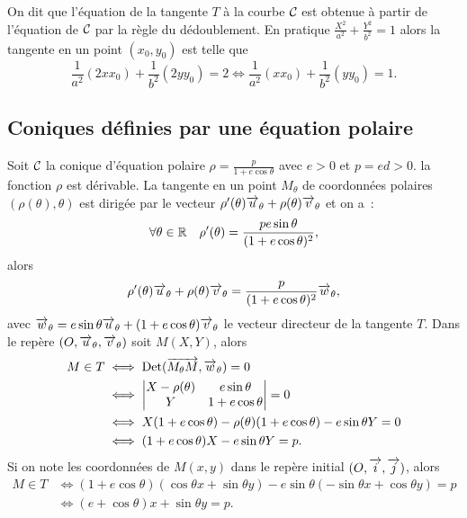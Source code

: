 On dit que l'équation de la tangente \(T\) à la courbe \(\mathcal{C}_{{}}\) est 
obtenue à partir de l'équation de \(\mathcal{C}_{{}}\) par la règle du 
dédoublement. En pratique \(\frac{X^2}{a^2} + \frac{Y^2}{b^2} = 1\) alors 
la tangente en un point \((x_0, y_0)\) est telle que
\begin{equation}
  \frac{1}{a^2}(2xx_0) + \frac{1}{b^2}(2yy_0) = 2 \iff \frac{1}{a^2}(xx_0) 
  + \frac{1}{b^2}(yy_0) = 1.
\end{equation}

\subsection{Coniques définies par une équation polaire}

Soit \(\mathcal{C}_{{}}\) la conique d'équation polaire \(\rho = \frac{p}{1 + e\cos 
\theta}\) avec \(e>0\) et \(p = ed>0\). la fonction \(\rho\) est 
dérivable. La tangente en un point \(M_{\theta}\) de coordonnées 
polaires \((\rho(\theta),\theta)\) est dirigée par le vecteur 
\(\rho'(\theta) \overrightarrow{u}_\theta + \rho(\theta) \overrightarrow{v}_\theta\) et on 
a~:
\begin{equation}
  \forall \theta \in \mathbb{R} \quad 
  \rho'(\theta) = \frac{pe\sin\theta}{(1 + e\cos\theta)^2},
\end{equation}
alors
\begin{equation}
  \rho'(\theta) \overrightarrow{u}_\theta + \rho(\theta) \overrightarrow{v}_\theta = 
  \frac{p}{(1 + e\cos\theta)^2} \overrightarrow{w}_\theta,
\end{equation}
avec \(\overrightarrow{w}_\theta = e\sin\theta\overrightarrow{u}_\theta + 
(1 + e\cos\theta)\overrightarrow{v}_\theta\) le vecteur directeur de la tangente 
\(T\). Dans le repère \((O, \overrightarrow{u}_\theta, \overrightarrow{v}_\theta)\) soit 
\(M(X, Y)\), alors
\begin{align}
  M \in T & \iff  \operatorname{Det}(\overrightarrow{M_\theta M},\overrightarrow{w}_\theta) = 0 \\
          & \iff \begin{vmatrix} X-\rho(\theta) & e\sin\theta \\ Y & 
          1 + e\cos\theta \end{vmatrix} = 0 \\
          & \iff 
          X(1 + e\cos\theta)-\rho(\theta)(1 + e\cos\theta)-e\sin\theta Y = 
          0\\
          & \iff (1 + e\cos\theta)X-e\sin\theta Y = p.
\end{align}
Si on note les coordonnées de \(M(x, y)\) dans le repère initial 
\((O,\overrightarrow{i},\overrightarrow{j})\), alors
\begin{align}
  M \in T &\iff (1 + e\cos\theta)(\cos\theta x + \sin\theta 
  y)-e\sin\theta(-\sin\theta x + \cos\theta y) = p\\
          &\iff (e + \cos\theta)x + \sin\theta y = p.
\end{align}

